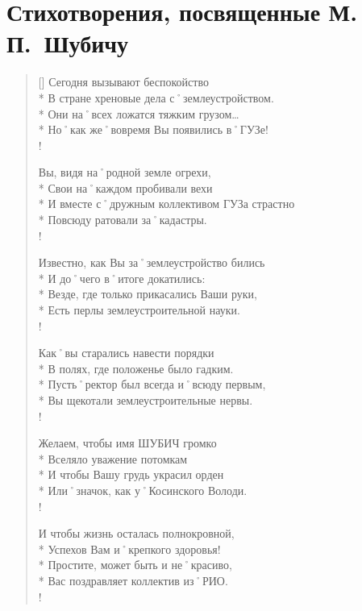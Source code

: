 ﻿\section{Стихотворения, посвященные М.\,П.~Шубичу}

\enlargethispage{2\baselineskip}												%

\settowidth{\versewidth}{И вместе с˚дружным коллективом ГУЗа страстно}		%
\begin{verse}[\versewidth]
Сегодня вызывают беспокойство\\*
В стране хреновые дела с˚землеустройством.\\*
Они на˚всех ложатся тяжким грузом…\\* 
Но˚как же˚вовремя Вы появились в˚ГУЗе!\\!

\vin Вы, видя на˚родной земле огрехи,\\*
\vin Свои на˚каждом пробивали вехи \\*
\vin И вместе с˚дружным коллективом ГУЗа страстно \\*
\vin Повсюду ратовали за˚кадастры.\\!

Известно, как Вы за˚землеустройство бились \\*
И до˚чего в˚итоге докатились:\\*
Везде, где только прикасались Ваши руки,\\*
Есть перлы землеустроительной науки.\\!

\vin Как˚вы старались навести порядки \\*
\vin В полях, где положенье было гадким.\\*
\vin Пусть˚ректор был всегда и˚всюду первым,\\*
\vin Вы щекотали землеустроительные нервы.\\!

Желаем, чтобы имя ШУБИЧ громко \\*
Вселяло уважение потомкам \\*
И чтобы Вашу грудь украсил орден \\*
Или˚значок, как у˚Косинского Володи.\\!

\vin И чтобы жизнь осталась полнокровной,\\*
\vin Успехов Вам и˚крепкого здоровья!\\*
\vin Простите, может быть и не˚красиво,\\*
\vin Вас поздравляет коллектив из˚РИО. \\!

\end{verse}

